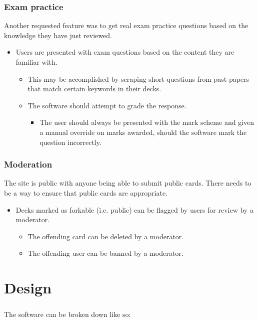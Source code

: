 \documentclass{report}
\begin{document}
\subsection{Exam practice}
Another requested feature was to get real exam practice questions based on the knowledge they have just reviewed.
\begin{itemize}
  \item Users are presented with exam questions based on the content they are familiar with.
  \begin{itemize}
    \item This may be accomplished by scraping short questions from past papers that match certain keywords in their decks.
    \item The software should attempt to grade the response.
    \begin{itemize}
      \item The user should always be presented with the mark scheme and given a manual override on marks awarded, should the software mark the question incorrectly.
    \end{itemize}
  \end{itemize}
\end{itemize}

\subsection{Moderation}
The site is public with anyone being able to submit public cards. There needs to be a way to ensure that public cards are appropriate.

\begin{itemize}
  \item Decks marked as forkable (i.e. public) can be flagged by users for review by a moderator.
  \begin{itemize}
    \item The offending card can be deleted by a moderator.
    \item The offending user can be banned by a moderator.
  \end{itemize} 
\end{itemize}

\chapter{Design}
\paragraph{}
The software can be broken down like so:
\end{document}
